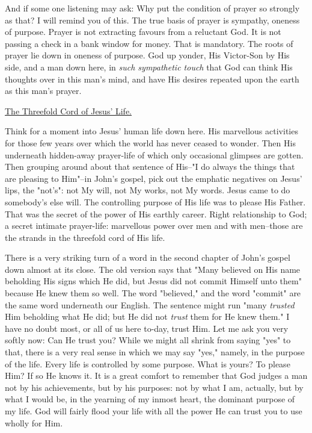 And if some one listening may ask: Why put the condition of prayer so
strongly as that? I will remind you of this. The true basis of prayer is
sympathy, oneness of purpose. Prayer is not extracting favours from a
reluctant God. It is not passing a check in a bank window for money. That
is mandatory. The roots of prayer lie down in oneness of purpose. God up
yonder, His Victor-Son by His side, and a man down here, in \textit{such
sympathetic touch} that God can think His thoughts over in this man's
mind, and have His desires repeated upon the earth as this man's prayer.



\underline{The Threefold Cord of Jesus' Life.}


Think for a moment into Jesus' human life down here. His marvellous
activities for those few years over which the world has never ceased to
wonder. Then His underneath hidden-away prayer-life of which only
occasional glimpses are gotten. Then grouping around about that sentence
of His--"I do always the things that are pleasing to Him"--in John's
gospel, pick out the emphatic negatives on Jesus' lips, the "not's": not
My will, not My works, not My words. Jesus came to do somebody's else
will. The controlling purpose of His life was to please His Father. That
was the secret of the power of His earthly career. Right relationship to
God; a secret intimate prayer-life: marvellous power over men and with
men--those are the strands in the threefold cord of His life.

There is a very striking turn of a word in the second chapter of John's
gospel down almost at its close. The old version says that "Many believed
on His name beholding His signs which He did, but Jesus did not commit
Himself unto them" because He knew them so well. The word "believed," and
the word "commit" are the same word underneath our English. The sentence
might run "many \textit{trusted} Him beholding what He did; but He did not
\textit{trust} them for He knew them." I have no doubt most, or all of us here
to-day, trust Him. Let me ask you very softly now: Can He trust you? While
we might all shrink from saying "yes" to that, there is a very real sense
in which we may say "yes," namely, in the purpose of the life. Every life
is controlled by some purpose. What is yours? To please Him? If so He
knows it. It is a great comfort to remember that God judges a man not by
his achievements, but by his purposes: not by what I am, actually, but by
what I would be, in the yearning of my inmost heart, the dominant purpose
of my life. God will fairly flood your life with all the power He can
trust you to use wholly for Him.

